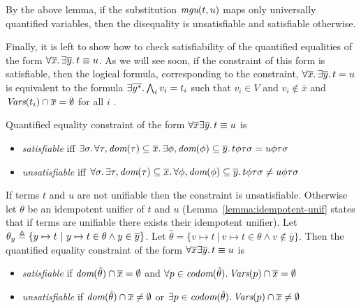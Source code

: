 By the above lemma, if the substitution $\textit{mgu}(t, u)$
maps only universally quantified variables,
then the disequality is unsatisfiable
and satisfiable otherwise.

Finally, it is left to show how to check satisfiability 
of the quantified equalities of the form 
$\forall \overline{x}\ldotp \exists \overline{y}\ldotp t \equiv u$.
As we will see soon, if the constraint of this 
form is satisfiable, then the logical formula,
corresponding to the constraint, 
$\forall \overline{x}\ldotp \exists \overline{y}\ldotp t = u$
is equivalent to the formula 
$\exists \overline{y^*}\ldotp \bigwedge_i v_i = t_i$
such that $v_i \in V$ and $v_i \not\in \overline{x}$ 
and $\textit{Vars}({t_i}) \cap \overline{x} = \emptyset$ for all $i$
\cite{liu1999constructive}.

\begin{definition}
  Quantified equality constraint of the form
  $\forall \overline{x} \exists \overline{y}\ldotp t \equiv u$ is
  \begin{itemize}
    \item \emph{satisfiable} iff
          ${\exists \sigma\ldotp 
            \forall \tau, \textit{dom}{({\tau})} \subseteq \overline{x}\ldotp 
            \exists \phi, \textit{dom}{({\phi})} \subseteq \overline{y}\ldotp 
            {{{t}{\phi}}{\tau}}{\sigma} = {{{u}{\phi}}{\tau}}{\sigma}
          }$
    \item \emph{unsatisfiable} iff
          ${\forall \sigma\ldotp 
            \exists \tau, \textit{dom}{({\tau})} \subseteq \overline{x}\ldotp 
            \forall \phi, \textit{dom}{({\phi})} \subseteq \overline{y}\ldotp 
            {{{t}{\phi}}{\tau}}{\sigma} \neq {{{u}{\phi}}{\tau}}{\sigma}
          }$
  \end{itemize}
\end{definition}

\begin{lemma}
  If terms $t$ and $u$ are not unifiable then the constraint is unsatisfiable.
  Otherwise let $\theta$ be an idempotent unifier of $t$ and $u$
  (Lemma~\ref{lemma:idempotent-unif} states that if terms are unifiable there exists their idempotent unifier).
  Let $\theta_{y} \triangleq \{y \mapsto t ~|~ y \mapsto t \in \theta \wedge y \in \overline{y}\}$.
  Let $\hat{\theta} = \{ v \mapsto t ~|~ v \mapsto t \in \theta \wedge v \not\in \overline{y} \}$.
  Then the quantified equality constraint of the form
  $\forall \overline{x} \exists \overline{y}\ldotp t \equiv u$ is
  \begin{itemize}
    \item \emph{satisfiable} if
          ${ \textit{dom}{({\hat{\theta}})} \cap \overline{x} = \emptyset }$ and 
          ${ \forall p \in \textit{codom}{({\hat{\theta}})} \ldotp \textit{Vars}({p}) \cap \overline{x} = \emptyset }$
    \item \emph{unsatisfiable} if
          ${ \textit{dom}{({\hat{\theta}})} \cap \overline{x} \neq \emptyset }$ or   
          ${ \exists p \in \textit{codom}{({\hat{\theta}})} \ldotp \textit{Vars}({p}) \cap \overline{x} \neq \emptyset }$
  \end{itemize}
\end{lemma}


